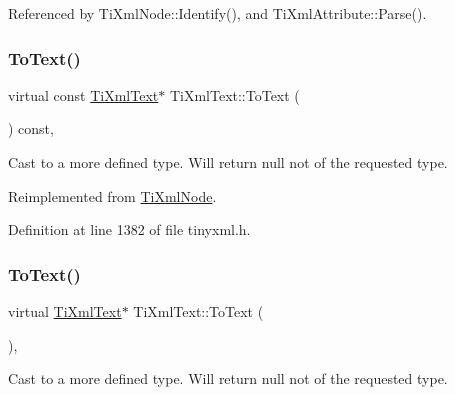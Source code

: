 Referenced by Ti\+Xml\+Node\+::\+Identify(), and Ti\+Xml\+Attribute\+::\+Parse().

\hypertarget{class_ti_xml_text_af8973cfd4ca00c5d934cb23e8aa0f5d5}{}\label{class_ti_xml_text_af8973cfd4ca00c5d934cb23e8aa0f5d5} 
\subsubsection{\texorpdfstring{To\+Text()}{ToText()}\hspace{0.1cm}{\footnotesize\ttfamily [1/2]}}
{\footnotesize\ttfamily virtual const \hyperlink{class_ti_xml_text}{Ti\+Xml\+Text}$\ast$ Ti\+Xml\+Text\+::\+To\+Text (\begin{DoxyParamCaption}{ }\end{DoxyParamCaption}) const\hspace{0.3cm}{\ttfamily [inline]}, {\ttfamily [virtual]}}



Cast to a more defined type. Will return null not of the requested type. 



Reimplemented from \hyperlink{class_ti_xml_node_a2591700660b308571c09166559a39332}{Ti\+Xml\+Node}.



Definition at line 1382 of file tinyxml.\+h.

\hypertarget{class_ti_xml_text_ae7c3a8fd3e4dbf6c0c4363a943d72f5b}{}\label{class_ti_xml_text_ae7c3a8fd3e4dbf6c0c4363a943d72f5b} 
\subsubsection{\texorpdfstring{To\+Text()}{ToText()}\hspace{0.1cm}{\footnotesize\ttfamily [2/2]}}
{\footnotesize\ttfamily virtual \hyperlink{class_ti_xml_text}{Ti\+Xml\+Text}$\ast$ Ti\+Xml\+Text\+::\+To\+Text (\begin{DoxyParamCaption}{ }\end{DoxyParamCaption})\hspace{0.3cm}{\ttfamily [inline]}, {\ttfamily [virtual]}}



Cast to a more defined type. Will return null not of the requested type. 



